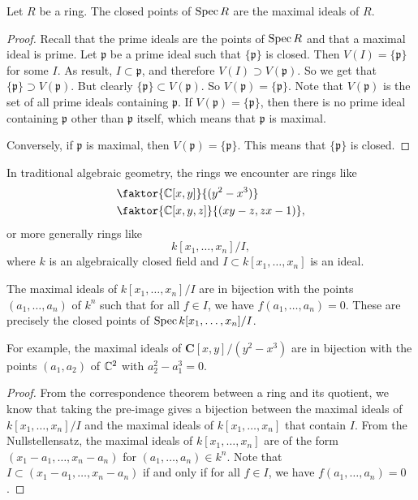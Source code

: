   \begin{proposition}
    Let \(R\) be a ring.
    The closed points of \(\operatorname{Spec} R\) are the maximal ideals of \(R\).
  \end{proposition}
  \begin{proof}
    Recall that the prime ideals are the points of $\operatorname{Spec}{R}$ and that a maximal ideal is prime.
    Let \(\mathfrak{p}\) be a prime ideal such that \(\{\mathfrak{p}\}\) is closed.
    Then \(V(I) = \{\mathfrak{p}\}\) for some \(I\).
    As result, \(I \subset \mathfrak{p}\), and therefore \(V(I) \supset V(\mathfrak{p})\).
    So we get that \(\{\mathfrak p\} \supset V(\mathfrak{p})\).
    But clearly \(\{\mathfrak p\} \subset V(\mathfrak{p})\).
    So \(V(\mathfrak p) = \{\mathfrak p\}\).
    Note that \(V(\mathfrak p)\) is the set of all prime ideals containing \(\mathfrak p\).
    If \(V(\mathfrak p) = \{\mathfrak p\}\), then there is no prime ideal containing \(\mathfrak p\) other than \(\mathfrak p\) itself, which means that \(\mathfrak p\) is maximal.

    Conversely, if \(\mathfrak p\) is maximal, then \(V(\mathfrak p) = \{\mathfrak p\}\).
    This means that \(\{\mathfrak p\}\) is closed.
  \end{proof}
  
In traditional algebraic geometry, the rings we encounter are rings like
\begin{align*}
    &\faktor{\C[x,y]}{(y^2-x^3)}\\
    &\faktor{\C[x,y,z]}{(xy-z,zx-1)},
\end{align*}
or more generally rings like
\[ k[x_1,\dots,x_n]/I,\]
where \(k\) is an algebraically closed field and \(I \subset k[x_1,\dots,x_n]\) is an ideal.
\begin{proposition}
  The maximal ideals of \( k[x_1,\dots,x_n]/I\) are in bijection with the points \((a_1,\dots,a_n)\) of \(k^n\) such that for all \(f \in I\), we have \(f(a_1,\dots,a_n) = 0\).
  These are precisely the closed points of \(\operatorname{Spec} k[x_1,\dots,x_n]/I\).
\end{proposition}
For example, the maximal ideals of \(\mathbf{C}[x,y]/(y^2-x^3)\) are in bijection with the points \((a_1,a_2)\) of \(\mathbb{C}^2\) with \(a_2^2-a_1^3 = 0\).
\begin{proof}
  From the correspondence theorem between a ring and its quotient, we know that taking the pre-image gives a bijection between the maximal ideals of \(k[x_1,\dots,x_n]/I\) and the maximal ideals of \(k[x_1,\dots,x_n]\) that contain \(I\).
  From the Nullstellensatz, the maximal ideals of $k[x_1,\dots,x_n]$ are of the form \((x_1-a_1,\dots,x_n-a_n)\) for \((a_1,\dots,a_n) \in k^n\).
  Note that \(I \subset (x_1-a_1,\dots,x_n-a_n) \) if and only if for all \(f \in I\), we have \(f(a_1,\dots,a_n) = 0\).    
\end{proof}

